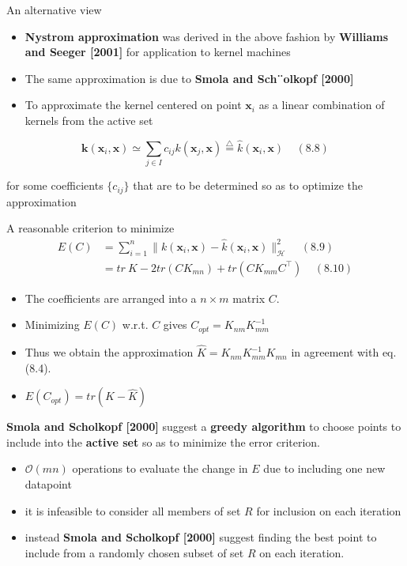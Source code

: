 \documentclass[
  ignorenonframetext,
]{beamer}
\providecommand{\tightlist}{%
  \setlength{\itemsep}{0pt}\setlength{\parskip}{0pt}}
\begin{document}
\begin{frame}{An alternative view}
\protect\hypertarget{an-alternative-view}{}
\begin{itemize}
\item
  \textbf{Nystrom approximation} was derived in the above fashion by
  \textbf{Williams and Seeger {[}2001{]}} for application to kernel
  machines
\item
  The same approximation is due to \textbf{Smola and Sch¨olkopf
  {[}2000{]}}
\item
  To approximate the kernel centered on point \(\pmb x_i\) as a linear
  combination of kernels from the active set
\end{itemize}

\[
\pmb k(\pmb x_i, \pmb x) \simeq \sum_{j \in I} c_{ij} k(\pmb x_j, \pmb x) \stackrel {\bigtriangleup} = \hat k (\pmb x_i, \pmb x) \ \ \ \ \ (8.8)
\]

for some coefficients \(\{c_{ij}\}\) that are to be determined so as to
optimize the approximation
\end{frame}

\begin{frame}{A reasonable criterion to minimize}
\protect\hypertarget{a-reasonable-criterion-to-minimize}{}
\[ 
\begin{split}
E(C) & = \sum^n_{i=1} \|k(\pmb x_i, \pmb x) - \hat k(\pmb x_i, \pmb x)\|^2_{\mathcal H} \ \ \ \ \ (8.9) \\
& = tr\ K - 2 tr(CK_{mn}) + tr(CK_{mm}C^{\top}) \ \ \ \ \ (8.10)
\end{split}
\]

\begin{itemize}
\item
  The coefficients are arranged into a \(n \times m\) matrix \(C\).
\item
  Minimizing \(E(C)\) w.r.t. \(C\) gives \(C_{opt} = K_{nm}K_{mm}^{-1}\)
\item
  Thus we obtain the approximation \(\hat K = K_{nm}K_{mm}^{-1} K_{mn}\)
  in agreement with eq. (8.4).
\item
  \(E(C_{opt}) = tr(K - \hat K)\)
\end{itemize}
\end{frame}

\begin{frame}{}
\protect\hypertarget{section-4}{}
\textbf{Smola and Scholkopf {[}2000{]}} suggest a \textbf{greedy
algorithm} to choose points to include into the \textbf{active set} so
as to minimize the error criterion.

\begin{itemize}
\tightlist
\item
  \(\mathcal O(mn)\) operations to evaluate the change in \(E\) due to
  including one new datapoint
\item
  it is infeasible to consider all members of set \(R\) for inclusion on
  each iteration
\item
  instead \textbf{Smola and Scholkopf {[}2000{]}} suggest finding the
  best point to include from a randomly chosen subset of set \(R\) on
  each iteration.
\end{itemize}
\end{frame}
\end{document}
